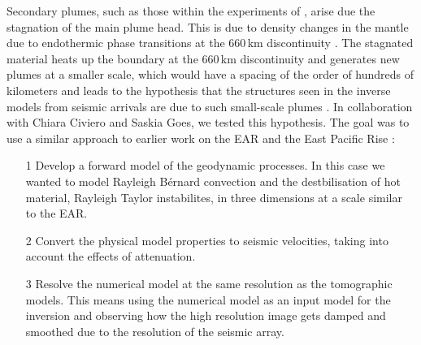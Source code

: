 Secondary plumes, such as those within the experiments of \cite{kumagai-etal-2007}, arise due the stagnation of the main plume head. This is due to density changes in the mantle due to endothermic phase transitions at the 660\,km discontinuity \citep[e.g.][]{tosi-2011,bossmann-2013}. The stagnated material heats up the boundary at the 660\,km discontinuity and generates new plumes at a smaller scale, which would have a spacing of the order of hundreds of kilometers and leads to the hypothesis that the structures seen in the inverse models from seismic arrivals are due to such small-scale plumes \citep{civiero-etal-2015}. In collaboration with Chiara Civiero and Saskia Goes, we tested this hypothesis. The goal was to use a similar approach to earlier work on the EAR and the East Pacific Rise \citep{armitage-etal-2015,goes-etal-2012}:
\begin{itemize}
\item[1] Develop a forward model of the geodynamic processes. In this case we wanted to model Rayleigh Bérnard convection and the destbilisation of hot material, Rayleigh Taylor instabilites, in three dimensions at a scale similar to the EAR.
\item[2] Convert the physical model properties to seismic velocities, taking into account the effects of attenuation.
\item[3] Resolve the numerical model at the same resolution as the tomographic models. This means using the numerical model as an input model for the inversion and observing how the high resolution image gets damped and smoothed due to the resolution of the seismic array.
\end{itemize}


